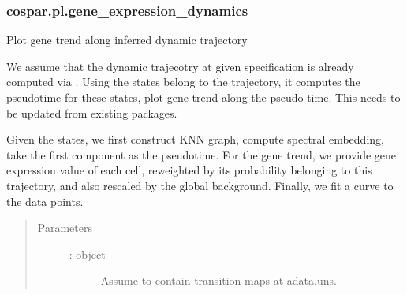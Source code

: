 \documentclass[letterpaper,10pt,english]{sphinxmanual}
\begin{document}
\subsubsection{cospar.pl.gene\_expression\_dynamics}
\label{\detokenize{cospar.pl.gene_expression_dynamics:cospar-pl-gene-expression-dynamics}}\label{\detokenize{cospar.pl.gene_expression_dynamics::doc}}

\begin{fulllineitems}
\label{\detokenize{cospar.pl.gene_expression_dynamics:cospar.pl.gene_expression_dynamics}}
Plot gene trend along inferred dynamic trajectory

We assume that the dynamic trajecotry at given specification is already
computed via . Using the states belong to the
trajectory, it computes the pseudotime for these states, plot gene trend
along the pseudo time. This needs to be updated from existing packages.

Given the states, we first construct KNN graph, compute spectral embedding,
take the first component as the pseudotime. For the gene trend, we provide
gene expression value of each cell, re\sphinxhyphen{}weighted by its probability belonging
to this trajectory, and also rescaled by the global background. Finally, we
fit a curve to the data points.
\begin{quote}\begin{description}
\item[{Parameters}] \leavevmode\begin{description}
\item[{ :  object}] \leavevmode
Assume to contain transition maps at adata.uns.


\end{description}
\end{description}
\end{quote}
\end{fulllineitems}
\end{document}
